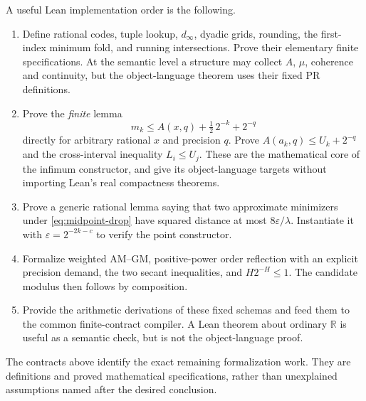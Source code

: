 A useful Lean implementation order is the following.
\begin{enumerate}
\item Define rational codes, tuple lookup, $d_\infty$, dyadic grids,
      rounding, the first-index minimum fold, and running intersections.
      Prove their elementary finite specifications.  At the semantic
      level a structure may collect $A$, $\mu$, coherence and continuity,
      but the object-language theorem uses their fixed PR definitions.
\item Prove the \emph{finite} lemma
      \[
      m_k\le A(x,q)+\tfrac12\,2^{-k}+2^{-q}
      \]
      directly for arbitrary rational $x$ and precision $q$.  Prove
      $A(a_k,q)\le U_k+2^{-q}$ and the cross-interval inequality
      $L_i\le U_j$.  These are the mathematical core of the infimum
      constructor, and give its object-language targets without
      importing Lean's real compactness theorems.
\item Prove a generic rational lemma saying that two approximate
      minimizers under \eqref{eq:midpoint-drop} have squared distance
      at most $8\varepsilon/\lambda$.  Instantiate it with
      $\varepsilon=2^{-2k-c}$ to verify the point constructor.
\item Formalize weighted AM--GM, positive-power order reflection with
      an explicit precision demand, the two secant inequalities, and
      $H2^{-H}\le1$.  The candidate modulus then follows by composition.
\item Provide the arithmetic derivations of these fixed schemas and
      feed them to the common finite-contract compiler.  A Lean theorem
      about ordinary $\mathbb R$ is useful as a semantic check, but
      is not the object-language \iPRA proof.
\end{enumerate}

The contracts above identify the exact remaining formalization work.
They are definitions and proved mathematical specifications, rather
than unexplained assumptions named after the desired conclusion.
